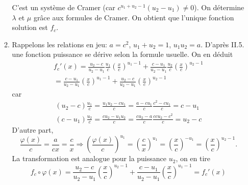 \begin{enumerate}
\begin{enumerate}
C'est un système de Cramer (car $c^{u_1+u_2-1}(u_2-u_1)\neq 0$). On détermine $\lambda$ et $\mu$ grâce aux formules de Cramer. On obtient que l'unique fonction solution est $f_c$.

\item Rappelons les relations en jeu: $a = c^2$, $u_1+u_2 = 1$, $u_1u_2 = a$.\newline
D'après II.5. une fonction puissance se dérive selon la formule usuelle. On en déduit
\begin{multline*}
  f_c'(x)
= \frac{u_2-c}{u_2-u_1}\frac{u_1}{c}\left( \frac{x}{c}\right)^{u_1-1} 
 +\frac{c-u_1}{u_2-u_1}\frac{u_2}{c}\left( \frac{x}{c}\right)^{u_2-1} \\
= \frac{c-u_1}{u_2-u_1}\left( \frac{x}{c}\right)^{u_1-1} 
 +\frac{u_2 - c}{u_2-u_1}\left( \frac{x}{c}\right)^{u_2-1}
\end{multline*}
car
\begin{align*}
  (u_2-c)\frac{u_1}{c} = \frac{u_1u_2-cu_1}{c}=\frac{a-cu_1}{c}\frac{c^2-cu_1}{c}=c-u_1 \\
  (c-u_1)\frac{u_2}{c} = \frac{cu_2 - u_1u_2}{c}=\frac{cu_2-a}{c}\frac{ccu_2-c^2}{c}= u_2 - c
\end{align*}
D'autre part,
\begin{displaymath}
  \frac{\varphi(x)}{c} = \frac{a}{cx} = \frac{c}{x}
\Rightarrow
\left(\frac{\varphi(x)}{c} \right)^{u_1}  = \left(\frac{c}{x} \right)^{u_1} = \left(\frac{x}{c} \right)^{-u_1} 
= \left(\frac{x}{c} \right)^{u_2 -1}.
\end{displaymath}
La transformation est analogue pour la puissance $u_2$, on en tire
\begin{displaymath}
f_c\circ \varphi(x)
=\frac{u_2-c}{u_2-u_1}\left(\frac{x}{c} \right)^{u_2 -1}
+\frac{c-u_1}{u_2-u_1}\left(\frac{x}{c} \right)^{u_1 -1} = f_c'(x)
\end{displaymath}
\end{enumerate}
\end{enumerate}

